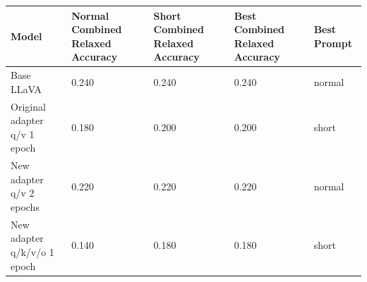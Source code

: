 \begin{tabular}{lllll}
\toprule
Model & Normal Combined Relaxed Accuracy & Short Combined Relaxed Accuracy & Best Combined Relaxed Accuracy & Best Prompt \\
\midrule
Base LLaVA & 0.240 & 0.240 & 0.240 & normal \\
Original adapter q/v 1 epoch & 0.180 & 0.200 & 0.200 & short \\
New adapter q/v 2 epochs & 0.220 & 0.220 & 0.220 & normal \\
New adapter q/k/v/o 1 epoch & 0.140 & 0.180 & 0.180 & short \\
\bottomrule
\end{tabular}

